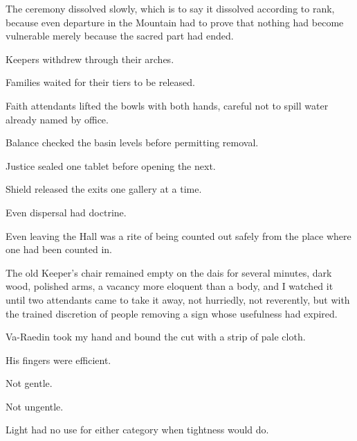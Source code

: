 
The ceremony dissolved slowly, which is to say it dissolved according to rank, because even departure in the Mountain had to prove that nothing had become vulnerable merely because the sacred part had ended.\par

Keepers withdrew through their arches.\par

Families waited for their tiers to be released.\par

Faith attendants lifted the bowls with both hands, careful not to spill water already named by office.\par

Balance checked the basin levels before permitting removal.\par

Justice sealed one tablet before opening the next.\par

Shield released the exits one gallery at a time.\par

Even dispersal had doctrine.\par

Even leaving the Hall was a rite of being counted out safely from the place where one had been counted in.\par

The old Keeper’s chair remained empty on the dais for several minutes, dark wood, polished arms, a vacancy more eloquent than a body, and I watched it until two attendants came to take it away, not hurriedly, not reverently, but with the trained discretion of people removing a sign whose usefulness had expired.\par

Va-Raedin took my hand and bound the cut with a strip of pale cloth.\par

His fingers were efficient.\par

Not gentle.\par

Not ungentle.\par

Light had no use for either category when tightness would do.\par

